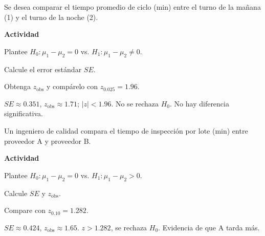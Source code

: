 \begin{ejercicio}
Se desea comparar el tiempo promedio de ciclo (min) entre el turno de la mañana (1) y el turno de la noche (2).


\textbf{Actividad}
\begin{pasos}
  \item Plantee $H_0:\mu_1-\mu_2=0$ vs. $H_1:\mu_1-\mu_2\neq 0$.
  \item Calcule el error estándar $SE$.
  \item Obtenga $z_{\text{obs}}$ y compárelo con $z_{0.025}=1.96$.
\end{pasos}

\begin{clave}
$SE\approx 0.351$, $z_{\text{obs}}\approx 1.71$; $|z|<1.96$.
No se rechaza $H_0$. No hay diferencia significativa.
\end{clave}
\end{ejercicio}

\begin{ejercicio}
Un ingeniero de calidad compara el tiempo de inspección por lote (min) entre proveedor A y proveedor B.


\textbf{Actividad}
\begin{pasos}
  \item Plantee $H_0:\mu_1-\mu_2=0$ vs. $H_1:\mu_1-\mu_2>0$.
  \item Calcule $SE$ y $z_{\text{obs}}$.
  \item Compare con $z_{0.10}=1.282$.
\end{pasos}

\begin{clave}
$SE\approx 0.424$, $z_{\text{obs}}\approx 1.65$.
$z>1.282$, se rechaza $H_0$. Evidencia de que A tarda más.
\end{clave}
\end{ejercicio}

